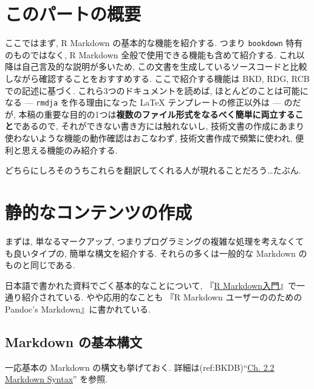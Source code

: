 \documentclass[
]{bxjsbook}
\theoremstyle{definition}
\theoremstyle{definition}
\theoremstyle{definition}
\theoremstyle{remark}
\begin{document}
\hypertarget{ux3053ux306eux30d1ux30fcux30c8ux306eux6982ux8981}{%
\chapter*{このパートの概要}\label{ux3053ux306eux30d1ux30fcux30c8ux306eux6982ux8981}}

ここではまず, R Markdown の基本的な機能を紹介する. つまり
\texttt{bookdown} 特有のものではなく, R Markdown
全般で使用できる機能も含めて紹介する.
これ以降は自己言及的な説明が多いため,
この文書を生成しているソースコードと比較しながら確認することをおすすめする.
ここで紹介する機能は BKD, RDG, RCB での記述に基づく.
これら3つのドキュメントを読めば, ほとんどのことは可能になる ---
\texttt{rmdja} を作る理由になった LaTeX テンプレートの修正以外は ---
のだが,
本稿の重要な目的の1つは\textbf{複数のファイル形式をなるべく簡単に両立すること}であるので,
それができない書き方には触れないし,
技術文書の作成にあまり使わないような機能の動作確認はおこなわず,
技術文書作成で頻繁に使われ, 便利と思える機能のみ紹介する.

どちらにしろそのうちこれらを翻訳してくれる人が現れることだろう\ldots たぶん.

\hypertarget{ux9759ux7684ux306aux30b3ux30f3ux30c6ux30f3ux30c4ux306eux4f5cux6210}{%
\chapter{静的なコンテンツの作成}\label{ux9759ux7684ux306aux30b3ux30f3ux30c6ux30f3ux30c4ux306eux4f5cux6210}}

まずは, 単なるマークアップ,
つまりプログラミングの複雑な処理を考えなくても良いタイプの,
簡単な構文を紹介する. それらの多くは一般的な Markdown
のものと同じである.

日本語で書かれた資料でごく基本的なことについて,
『\href{https://kazutan.github.io/kazutanR/Rmd_intro.html}{R
Markdown入門}』で一通り紹介されている. やや応用的なことも 『R Markdown
ユーザーののための Pandoc's Markdown』に書かれている.

\hypertarget{markdown-ux306eux57faux672cux69cbux6587}{%
\section{Markdown
の基本構文}\label{markdown-ux306eux57faux672cux69cbux6587}}

一応基本の Markdown の構文も挙げておく.
詳細は(ref:BKDB)``\href{https://bookdown.org/yihui/bookdown/markdown-syntax.html}{Ch.
2.2 Markdown Syntax}'' を参照.
\end{document}
